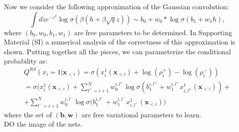 \documentclass[aps,physrev,10pt,floatfix,longbibliography,nofootinbib,reprint]{revtex4-2}
\begin{document}
Now we consider the following approximation of the Gaussian convolution:
\[
\int dz e^{-z^2}
\log \sigma \left(\beta \left(
h +\beta \sqrt{q}z \right)\right) \sim b_0 + w_0*\log \sigma(b_1 + w_1 h), 
\]
where $(b_0, w_0, b_1,w_1)$ are free parameters to be determined. In Supporting Material (SI) a numerical analysis of the correctness of this approximation is shown.  
Putting together all the pieces, we can parameterize the conditional probability as:
\begin{multline}
Q^{RS}\left(x_{i}=1|\mathbf{x}_{<i}\right) = \sigma\left( 
    x_i^1(\mathbf{x}_{<i}) +\log(\rho_i^+) - \log(\rho_i^-)
\right) \\
 = \sigma \bigg( x_i^1(\mathbf{x}_{<i}) + \sum_{l^+=i+1}^{N}  w_0^{i,l^+} \log\sigma(b_1^{i,l^+} +
 w_1^{i,l^+} x_{i,l^+}^1(\mathbf{x}_{<i}))+ \\
 + \sum_{l^-=i+1}^{N}  w_0^{i,l^-} \log\sigma(b_1^{i,l^-} + w_1^{i,l^-} x_{i,l^-}^1(\mathbf{x}_{<i})
 \bigg) 
\end{multline}
where the set of $(\mathbf{b},\mathbf{w})$ are free variational parameters to learn. 
\\DO the image of the nets.
\end{document}
